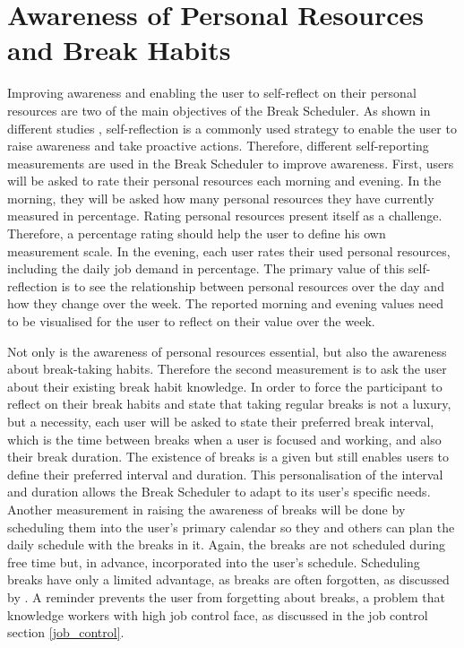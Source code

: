 \documentclass{hasel_thesis}
\begin{document}
\section{Awareness of Personal Resources and Break Habits}
Improving awareness and enabling the user to self-reflect on their personal resources are two of the main objectives of the Break Scheduler. As shown in different studies \cite{GRANT20083}, self-reflection is a commonly used strategy to enable the user to raise awareness and take proactive actions. Therefore, different self-reporting measurements are used in the Break Scheduler to improve awareness. First, users will be asked to rate their personal resources each morning and evening. In the morning, they will be asked how many personal resources they have currently measured in percentage. Rating personal resources present itself as a challenge. Therefore, a percentage rating should help the user to define his own measurement scale. In the evening, each user rates their used personal resources, including the daily job demand in percentage. The primary value of this self-reflection is to see the relationship between personal resources over the day and how they change over the week. The reported morning and evening values need to be visualised for the user to reflect on their value over the week.

Not only is the awareness of personal resources essential, but also the awareness about break-taking habits. Therefore the second measurement is to ask the user about their existing break habit knowledge. In order to force the participant to reflect on their break habits and state that taking regular breaks is not a luxury, but a necessity, each user will be asked to state their preferred break interval, which is the time between breaks when a user is focused and working, and also their break duration. The existence of breaks is a given but still enables users to define their preferred interval and duration. This personalisation of the interval and duration allows the Break Scheduler to adapt to its user's specific needs. Another measurement in raising the awareness of breaks will be done by scheduling them into the user's primary calendar so they and others can plan the daily schedule with the breaks in it. Again, the breaks are not scheduled during free time but, in advance, incorporated into the user's schedule. Scheduling breaks have only a limited advantage, as breaks are often forgotten, as discussed by \cite{McLean.2001}. A reminder prevents the user from forgetting about breaks, a problem that knowledge workers with high job control face, as discussed in the job control section \ref{job_control}.
\end{document}
